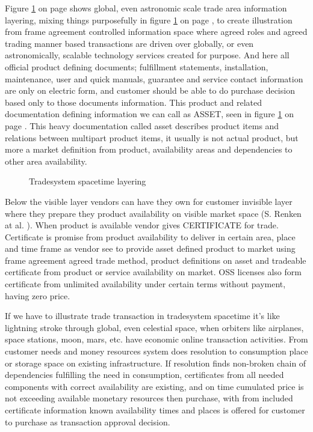Figure \ref{fig:layering} on page \pageref{fig:layering} shows global, even astronomic scale trade area information layering, mixing things purposefully in figure \ref{fig:layering} on page \pageref{fig:layering}, to create illustration from frame agreement controlled information space where agreed roles and agreed trading manner based transactions are driven over globally, or even astronomically, scalable technology services created for purpose. And here all official product defining documents; fulfillment statements, installation, maintenance, user and quick manuals, guarantee and service contact information are only on electric form, and customer should be able to do purchase decision based only to those documents information. This product and related documentation defining information we can call as ASSET, seen in figure \ref{fig:layering} on page \pageref{fig:layering}. This heavy documentation called asset describes product items and relations between multipart product items, it usually is not actual product, but more a market definition from product, availability areas and dependencies to other area availability.

\begin{figure} %
 \begin{center}
  \caption{Tradesystem spacetime layering}
  \label{fig:layering}
 \end{center}
\end{figure}

Below the visible layer vendors can have they own for customer invisible layer where they prepare they product availability on visible market space (S. Renken at al. \cite{RenkenNRWC2022}). When product is available vendor gives CERTIFICATE for trade. Certificate is promise from product availability to deliver in certain area, place and time frame as vendor see to provide asset defined product to market using frame agreement agreed trade method, product definitions on asset and tradeable certificate from product or service availability on market. OSS licenses also form certificate from unlimited availability under certain terms without payment, having zero price.

If we have to illustrate trade transaction in tradesystem spacetime it's like lightning stroke through global, even celestial space, when orbiters like airplanes, space stations, moon, mars, etc. have economic online transaction activities. From customer needs and money resources system does resolution to consumption place or storage space on existing infrastructure. If resolution finds non-broken chain of dependencies fulfilling the need in consumption, certificates from all needed components with correct availability are existing, and on time cumulated price is not exceeding available monetary resources then purchase, with from included certificate information known availability times and places is offered for customer to purchase as transaction approval decision.

